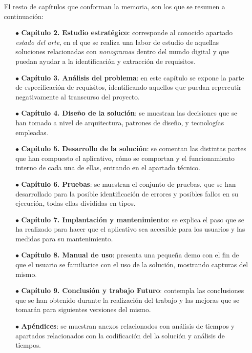 El resto de capítulos que conforman la memoria, son los que se resumen a continuación:

\begin{itemize}
   \item[$\bullet$] \textbf{Capítulo 2. Estudio estratégico}: corresponde al conocido apartado \textit{estado del arte}, en el que se realiza una labor 
   de estudio de aquellas soluciones relacionadas con \textit{nonogramas} dentro del mundo digital y que puedan ayudar a la identificación y extracción de requisitos.
   \item[$\bullet$] \textbf{Capítulo 3. Análisis del problema}: en este capítulo se expone la parte de especificación de requisitos,
    identificando aquellos que puedan repercutir negativamente al transcurso del proyecto.
   \item[$\bullet$] \textbf{Capítulo 4. Diseño de la solución}: se muestran las decisiones que se han tomado a nivel de arquitectura, patrones de diseño, 
   y tecnologías empleadas.
   \item[$\bullet$] \textbf{Capítulo 5. Desarrollo de la solución}: se comentan las distintas partes que han compuesto el aplicativo, cómo se comportan y 
   el funcionamiento interno de cada una de ellas, entrando en el apartado técnico.
   \item[$\bullet$] \textbf{Capítulo 6. Pruebas}: se muestran el conjunto de pruebas, que se han desarrollado para la posible identificación de 
   errores y posibles fallos en su ejecución, todas ellas divididas en tipos. 
   \item[$\bullet$] \textbf{Capítulo 7. Implantación y mantenimiento}: se explica el paso que se ha realizado para hacer que el aplicativo sea accesible
   para los usuarios y las medidas para su mantenimiento. 
   \item[$\bullet$] \textbf{Capítulo 8. Manual de uso}: presenta una pequeña demo con el fin de que el usuario se familiarice con el uso de
   la solución, mostrando capturas del mismo.
   \item[$\bullet$] \textbf{Capítulo 9. Conclusión y trabajo Futuro}: contempla las conclusiones que se han obtenido durante la realización del trabajo y
   las mejoras que se tomarán para siguientes versiones del mismo.
   \item[$\bullet$] \textbf{Apéndices}: se muestran anexos relacionados con análisis de tiempos y apartados relacionados con la codificación del
   la solución y análisis de tiempos.
\end{itemize}